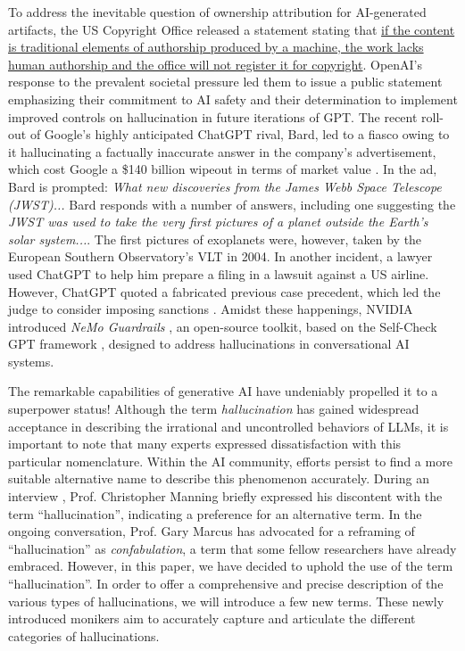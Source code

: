 To address the inevitable question of ownership attribution for AI-generated artifacts, the US Copyright Office  \cite{copyright_2023} released a statement stating that \ul{if the content is traditional elements of authorship produced by a machine, the work lacks human authorship and the office will not register it for copyright}. 
OpenAI's response to the prevalent societal pressure led them to issue a public statement \cite{openaisafety} emphasizing their commitment to AI safety and their determination to implement improved controls on hallucination in future iterations of GPT. The recent roll-out of Google's highly anticipated ChatGPT rival, Bard, led to a fiasco owing to it hallucinating a factually inaccurate answer in the company's advertisement, which cost Google a \$140 billion wipeout in terms of market value \cite{goog}. In the ad, Bard is prompted: \emph{What new discoveries from the James Webb Space Telescope (JWST)...} Bard responds with a number of answers, including one suggesting the \emph{JWST was used to take the very first pictures of a planet outside the Earth's solar system...}. The first pictures of exoplanets were, however, taken by the European Southern Observatory's VLT in 2004. In another incident, a lawyer used ChatGPT to help him prepare a filing in a lawsuit against a US airline. However, ChatGPT quoted a fabricated previous case precedent, which led the judge to consider imposing sanctions \cite{forbes2023}.
Amidst these happenings, NVIDIA introduced \textit{NeMo Guardrails} \cite{nemo}, an open-source toolkit, based on the Self-Check GPT framework \cite{manakul2023selfcheckgpt}, designed to address hallucinations in conversational AI systems. 

The remarkable capabilities of generative AI have undeniably propelled it to a superpower status! Although the term \emph{hallucination} has gained widespread acceptance in describing the irrational and uncontrolled behaviors of LLMs, it is important to note that many experts expressed dissatisfaction with this particular nomenclature.  Within the AI community, efforts persist to find a more suitable alternative name to describe this phenomenon accurately. During an interview \cite{YouTube_2023}, Prof. Christopher Manning 
briefly expressed his discontent with the term ``hallucination'', indicating a preference for an alternative term. In the ongoing conversation, Prof. Gary Marcus has advocated for a reframing of ``hallucination'' as \emph{confabulation}, a term that some fellow researchers have already embraced. However, in this paper, we have decided to uphold the use of the term ``hallucination''. In order to offer a comprehensive and precise description of the various types of hallucinations, we will introduce a few new terms. These newly introduced monikers aim to accurately capture and articulate the different categories of hallucinations. 


